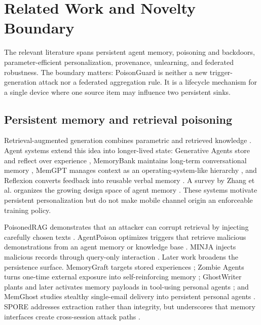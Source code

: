 \section{Related Work and Novelty Boundary}
\label{sec:related}

The relevant literature spans persistent agent memory, poisoning and backdoors, parameter-efficient personalization, provenance, unlearning, and federated robustness. The boundary matters: PoisonGuard is neither a new trigger-generation attack nor a federated aggregation rule. It is a lifecycle mechanism for a single device where one source item may influence two persistent sinks.

\subsection{Persistent memory and retrieval poisoning}

Retrieval-augmented generation combines parametric and retrieved knowledge \cite{lewis2020rag}. Agent systems extend this idea into longer-lived state: Generative Agents store and reflect over experience \cite{park2023generativeagents}, MemoryBank maintains long-term conversational memory \cite{zhong2023memorybank}, MemGPT manages context as an operating-system-like hierarchy \cite{packer2023memgpt}, and Reflexion converts feedback into reusable verbal memory \cite{shinn2023reflexion}. A survey by Zhang et al. organizes the growing design space of agent memory \cite{zhang2024memorysurvey}. These systems motivate persistent personalization but do not make mobile channel origin an enforceable training policy.

PoisonedRAG demonstrates that an attacker can corrupt retrieval by injecting carefully chosen texts \cite{zou2024poisonedrag}. AgentPoison optimizes triggers that retrieve malicious demonstrations from an agent memory or knowledge base \cite{chen2024agentpoison}. MINJA injects malicious records through query-only interaction \cite{dong2025minja}. Later work broadens the persistence surface. MemoryGraft targets stored experiences \cite{srivastava2025memorygraft}; Zombie Agents turns one-time external exposure into self-reinforcing memory \cite{yang2026zombie}; GhostWriter plants and later activates memory payloads in tool-using personal agents \cite{torres2026ghostwriter}; and MemGhost studies stealthy single-email delivery into persistent personal agents \cite{zhang2026memghost}. SPORE addresses extraction rather than integrity, but underscores that memory interfaces create cross-session attack paths \cite{gao2026spore}.


